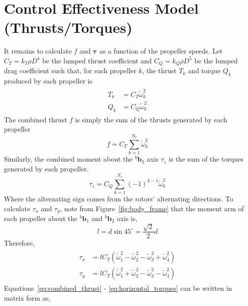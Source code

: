 \documentclass{article}
\begin{document}
	\section*{Control Effectiveness Model (Thrusts/Torques)}
		It remains to calculate $f$ and $\mathbf{\tau}$ as a function of the propeller speeds.  Let $C_T = k_T \rho D^4$ be the lumped thrust coefficient and $C_Q = k_Q \rho D^5$ be the lumped drag coefficient such that, for each propeller $k$, the thrust $T_k$ and torque $Q_k$ produced by each propeller is
		\begin{align}
			\begin{split}
				T_k &= C_T \tilde{\omega}_k^2 \\
				Q_k &= C_Q \tilde{\omega}_k^2
			\end{split}
		\end{align}
		The combined thrust $f$ is simply the sum of the thrusts generated by each propeller
		\begin{equation}
			f = C_T \sum_{k=1}^{N_r}{ \tilde{\omega}_k^2}
			\label{eq:combined_thrust}
		\end{equation}
		Similarly, the combined moment about the ${}^b \mathbf{b}_3$ axis $\tau_z$ is the sum of the torques generated by each propeller.  
		\begin{equation}
			\tau_z = C_Q \sum_{k=1}^{N_r}{\left(-1\right)^{k-1} \tilde{\omega}_k^2}
		\end{equation}
		Where the alternating sign comes from the rotors' alternating directions.  To calculate $\tau_x$ and $\tau_y$, note from Figure~\ref{fig:body_frame} that the moment arm of each propeller about the ${}^b \mathbf{b}_1$ and ${}^b \mathbf{b}_2$ axis is,
		\begin{equation}
			l = d \sin{45^\circ} = \frac{\sqrt{2}}{2}d
		\end{equation}
		Therefore,
		\begin{align}
			\begin{split}
				\tau_x &= lC_T\left(\tilde{\omega}_1^2 - \tilde{\omega}_2^2 - \tilde{\omega}_3^2 + \tilde{\omega}_4^2\right)\\
				\tau_y &=  lC_T\left(\tilde{\omega}_1^2 + \tilde{\omega}_2^2 - \tilde{\omega}_3^2 - \tilde{\omega}_4^2\right)
			\end{split}
			\label{eq:horizontal_torques}
		\end{align}
		Equations~\ref{eq:combined_thrust} - \ref{eq:horizontal_torques} can be written in matrix form as,
\end{document}

